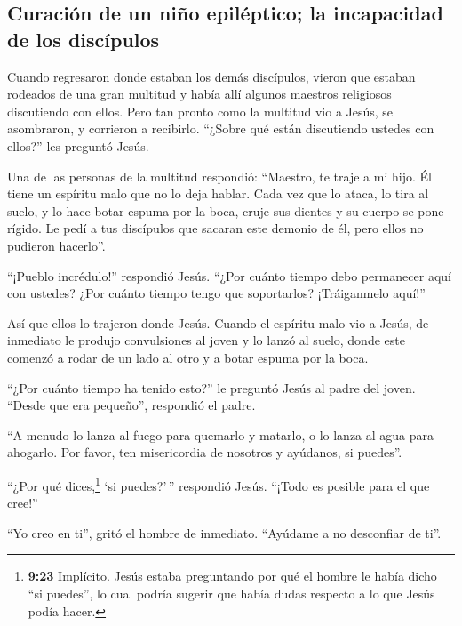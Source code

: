 \hypertarget{curaciuxf3n-de-un-niuxf1o-epiluxe9ptico-la-incapacidad-de-los-discuxedpulos}{%
\subsection{Curación de un niño epiléptico; la incapacidad de los
discípulos}\label{curaciuxf3n-de-un-niuxf1o-epiluxe9ptico-la-incapacidad-de-los-discuxedpulos}}

 Cuando regresaron donde estaban los demás discípulos,
vieron que estaban rodeados de una gran multitud y había allí algunos
maestros religiosos discutiendo con ellos.  Pero tan
pronto como la multitud vio a Jesús, se asombraron, y corrieron a
recibirlo.  ``¿Sobre qué están discutiendo ustedes con
ellos?'' les preguntó Jesús.

 Una de las personas de la multitud respondió: ``Maestro,
te traje a mi hijo. Él tiene un espíritu malo que no lo deja hablar.
 Cada vez que lo ataca, lo tira al suelo, y lo hace botar
espuma por la boca, cruje sus dientes y su cuerpo se pone rígido. Le
pedí a tus discípulos que sacaran este demonio de él, pero ellos no
pudieron hacerlo''.

 ``¡Pueblo incrédulo!'' respondió Jesús. ``¿Por cuánto
tiempo debo permanecer aquí con ustedes? ¿Por cuánto tiempo tengo que
soportarlos? ¡Tráiganmelo aquí!''

 Así que ellos lo trajeron donde Jesús. Cuando el
espíritu malo vio a Jesús, de inmediato le produjo convulsiones al joven
y lo lanzó al suelo, donde este comenzó a rodar de un lado al otro y a
botar espuma por la boca.

 ``¿Por cuánto tiempo ha tenido esto?'' le preguntó Jesús
al padre del joven. ``Desde que era pequeño'', respondió el padre.

 ``A menudo lo lanza al fuego para quemarlo y matarlo, o
lo lanza al agua para ahogarlo. Por favor, ten misericordia de nosotros
y ayúdanos, si puedes''.

 ``¿Por qué dices,\footnote{\textbf{9:23} Implícito.
  Jesús estaba preguntando por qué el hombre le había dicho ``si
  puedes'', lo cual podría sugerir que había dudas respecto a lo que
  Jesús podía hacer.} `si puedes?'\,'' respondió Jesús. ``¡Todo es
posible para el que cree!''

 ``Yo creo en ti'', gritó el hombre de inmediato.
``Ayúdame a no desconfiar de ti''.


